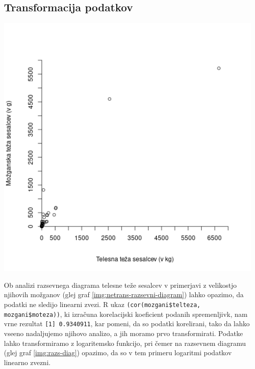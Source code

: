 \subsection{Transformacija podatkov}

\begin{minipage}{0.45\textwidth}
    \includegraphics[width=1\textwidth]{res/netrans-razsevni-diagram.png}
    \label{img:netrans-razsevni-diagram}
\end{minipage}
\hfill
\begin{minipage}{0.55\textwidth}
    Ob analizi razsevnega diagrama telesne teže sesalcev v primerjavi z velikostjo njihovih možganov
    (glej graf \ref{img:netrans-razsevni-diagram}) lahko opazimo, da podatki ne sledijo linearni zvezi.
    R ukaz \verb|(cor(mozgani$telteza, mozgani$moteza))|, ki izračuna korelacijski koeficient podanih spremenljivk,
    nam vrne rezultat \verb|[1] 0.9340911|, kar pomeni, da so podatki korelirani, tako da lahko vseeno nadaljujemo
    njihovo analizo, a jih moramo prvo transformirati.
    Podatke lahko transformiramo z logaritemsko funkcijo, pri čemer na razsevnem diagramu (glej graf \ref{img:razs-diag})
    opazimo, da so v tem primeru logaritmi podatkov linearno zvezni.
\end{minipage}
\\

